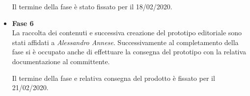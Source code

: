 \begin{itemize}
	Il termine della fase è stato fissato per il 18/02/2020.
	\item \textbf{Fase 6}\\
	La raccolta dei contenuti e successiva creazione del prototipo editoriale 
	sono stati affidati a \textit{Alessandro Annese}. Successivamente al 
	completamento della fase si è occupato anche di effettuare la consegna del 
	prototipo con la relativa documentazione al committente.
	
	Il termine della fase e relativa consegna del prodotto è fissato per il 
	21/02/2020.
\end{itemize}

